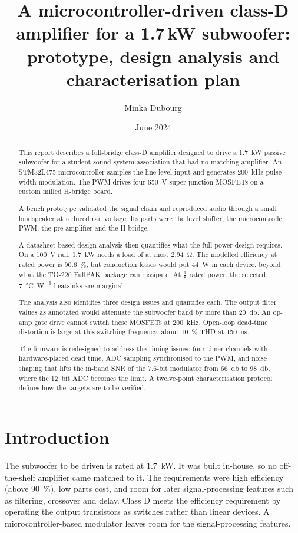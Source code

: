 \documentclass[10pt,a4paper]{article}
\title{\textbf{A microcontroller-driven class-D amplifier for a 1.7\,kW subwoofer:\\prototype, design analysis and characterisation plan}}
\author{Minka Dubourg}
\date{June 2024}
\begin{document}
\maketitle

\begin{abstract}
\noindent
This report describes a full-bridge class-D amplifier designed to drive a \SI{1.7}{\kilo\watt} passive subwoofer for a student sound-system association that had no matching amplifier. An STM32L475 microcontroller samples the line-level input and generates \SI{200}{\kilo\hertz} pulse-width modulation. The PWM drives four \SI{650}{\volt} super-junction MOSFETs on a custom milled H-bridge board.

A bench prototype validated the signal chain and reproduced audio through a small loudspeaker at reduced rail voltage. Its parts were the level shifter, the microcontroller PWM, the pre-amplifier and the H-bridge.

A datasheet-based design analysis then quantifies what the full-power design requires. On a \SI{100}{\volt} rail, \SI{1.7}{\kilo\watt} needs a load of at most \SI{2.94}{\ohm}. The modelled efficiency at rated power is \SI{90.6}{\percent}, but conduction losses would put \SI{44}{\watt} in each device, beyond what the TO-220 FullPAK package can dissipate. At $\tfrac18$ rated power, the selected \SI{7}{\celsius\per\watt} heatsinks are marginal.

The analysis also identifies three design issues and quantifies each. The output filter values as annotated would attenuate the subwoofer band by more than \SI{20}{\decibel}. An op-amp gate drive cannot switch these MOSFETs at \SI{200}{\kilo\hertz}. Open-loop dead-time distortion is large at this switching frequency, about \SI{10}{\percent} THD at \SI{150}{\nano\second}.

The firmware is redesigned to address the timing issues: four timer channels with hardware-placed dead time, ADC sampling synchronised to the PWM, and noise shaping that lifts the in-band SNR of the 7.6-bit modulator from \SI{66}{\decibel} to \SI{98}{\decibel}, where the \SI{12}{bit} ADC becomes the limit. A twelve-point characterisation protocol defines how the targets are to be verified.
\end{abstract}

\section{Introduction}
The subwoofer to be driven is rated at \SI{1.7}{\kilo\watt}. It was built in-house, so no off-the-shelf amplifier came matched to it. The requirements were high efficiency (above \SI{90}{\percent}), low parts cost, and room for later signal-processing features such as filtering, crossover and delay. Class D meets the efficiency requirement by operating the output transistors as switches rather than linear devices. A microcontroller-based modulator leaves room for the signal-processing features.
\end{document}
